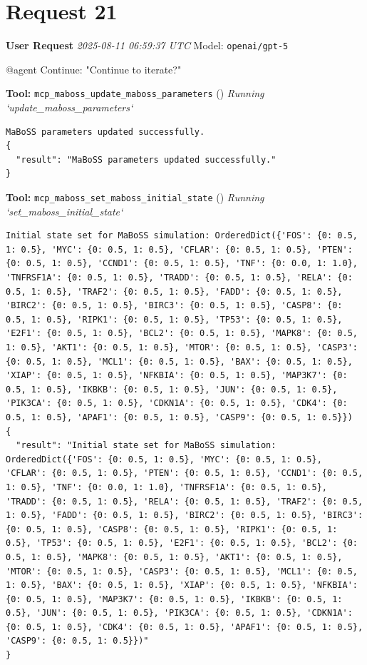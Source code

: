 \documentclass[11pt,a4paper]{article}
\begin{document}
\section{Request 21}
\begin{userbox}
\textbf{User Request}
\quad \textit{2025-08-11 06:59:37 UTC}
\quad Model: \texttt{openai/gpt-5}

@agent Continue: "Continue to iterate?"

\end{userbox}
\begin{toolokbox}
\textbf{Tool:} \texttt{mcp\_maboss\_update\_maboss\_parameters} (\checkmark)
\textit{Running `update\_maboss\_parameters`}
\begin{lstlisting}
MaBoSS parameters updated successfully.
{
  "result": "MaBoSS parameters updated successfully."
}
\end{lstlisting}
\end{toolokbox}
\begin{toolokbox}
\textbf{Tool:} \texttt{mcp\_maboss\_set\_maboss\_initial\_state} (\checkmark)
\textit{Running `set\_maboss\_initial\_state`}
\begin{lstlisting}
Initial state set for MaBoSS simulation: OrderedDict({'FOS': {0: 0.5, 1: 0.5}, 'MYC': {0: 0.5, 1: 0.5}, 'CFLAR': {0: 0.5, 1: 0.5}, 'PTEN': {0: 0.5, 1: 0.5}, 'CCND1': {0: 0.5, 1: 0.5}, 'TNF': {0: 0.0, 1: 1.0}, 'TNFRSF1A': {0: 0.5, 1: 0.5}, 'TRADD': {0: 0.5, 1: 0.5}, 'RELA': {0: 0.5, 1: 0.5}, 'TRAF2': {0: 0.5, 1: 0.5}, 'FADD': {0: 0.5, 1: 0.5}, 'BIRC2': {0: 0.5, 1: 0.5}, 'BIRC3': {0: 0.5, 1: 0.5}, 'CASP8': {0: 0.5, 1: 0.5}, 'RIPK1': {0: 0.5, 1: 0.5}, 'TP53': {0: 0.5, 1: 0.5}, 'E2F1': {0: 0.5, 1: 0.5}, 'BCL2': {0: 0.5, 1: 0.5}, 'MAPK8': {0: 0.5, 1: 0.5}, 'AKT1': {0: 0.5, 1: 0.5}, 'MTOR': {0: 0.5, 1: 0.5}, 'CASP3': {0: 0.5, 1: 0.5}, 'MCL1': {0: 0.5, 1: 0.5}, 'BAX': {0: 0.5, 1: 0.5}, 'XIAP': {0: 0.5, 1: 0.5}, 'NFKBIA': {0: 0.5, 1: 0.5}, 'MAP3K7': {0: 0.5, 1: 0.5}, 'IKBKB': {0: 0.5, 1: 0.5}, 'JUN': {0: 0.5, 1: 0.5}, 'PIK3CA': {0: 0.5, 1: 0.5}, 'CDKN1A': {0: 0.5, 1: 0.5}, 'CDK4': {0: 0.5, 1: 0.5}, 'APAF1': {0: 0.5, 1: 0.5}, 'CASP9': {0: 0.5, 1: 0.5}})
{
  "result": "Initial state set for MaBoSS simulation: OrderedDict({'FOS': {0: 0.5, 1: 0.5}, 'MYC': {0: 0.5, 1: 0.5}, 'CFLAR': {0: 0.5, 1: 0.5}, 'PTEN': {0: 0.5, 1: 0.5}, 'CCND1': {0: 0.5, 1: 0.5}, 'TNF': {0: 0.0, 1: 1.0}, 'TNFRSF1A': {0: 0.5, 1: 0.5}, 'TRADD': {0: 0.5, 1: 0.5}, 'RELA': {0: 0.5, 1: 0.5}, 'TRAF2': {0: 0.5, 1: 0.5}, 'FADD': {0: 0.5, 1: 0.5}, 'BIRC2': {0: 0.5, 1: 0.5}, 'BIRC3': {0: 0.5, 1: 0.5}, 'CASP8': {0: 0.5, 1: 0.5}, 'RIPK1': {0: 0.5, 1: 0.5}, 'TP53': {0: 0.5, 1: 0.5}, 'E2F1': {0: 0.5, 1: 0.5}, 'BCL2': {0: 0.5, 1: 0.5}, 'MAPK8': {0: 0.5, 1: 0.5}, 'AKT1': {0: 0.5, 1: 0.5}, 'MTOR': {0: 0.5, 1: 0.5}, 'CASP3': {0: 0.5, 1: 0.5}, 'MCL1': {0: 0.5, 1: 0.5}, 'BAX': {0: 0.5, 1: 0.5}, 'XIAP': {0: 0.5, 1: 0.5}, 'NFKBIA': {0: 0.5, 1: 0.5}, 'MAP3K7': {0: 0.5, 1: 0.5}, 'IKBKB': {0: 0.5, 1: 0.5}, 'JUN': {0: 0.5, 1: 0.5}, 'PIK3CA': {0: 0.5, 1: 0.5}, 'CDKN1A': {0: 0.5, 1: 0.5}, 'CDK4': {0: 0.5, 1: 0.5}, 'APAF1': {0: 0.5, 1: 0.5}, 'CASP9': {0: 0.5, 1: 0.5}})"
}
\end{lstlisting}
\end{toolokbox}
\end{document}
